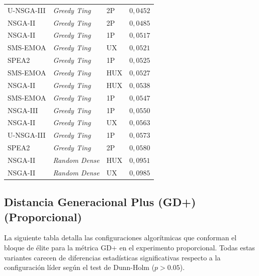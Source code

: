 \begin{longtable}{lllc}
U-NSGA-III & \textit{Greedy Ting} & 2P & $0{,}0452$ \\
NSGA-II & \textit{Greedy Ting} & 2P & $0{,}0485$ \\
NSGA-II & \textit{Greedy Ting} & 1P & $0{,}0517$ \\
SMS-EMOA & \textit{Greedy Ting} & UX & $0{,}0521$ \\
SPEA2 & \textit{Greedy Ting} & 1P & $0{,}0525$ \\
SMS-EMOA & \textit{Greedy Ting} & HUX & $0{,}0527$ \\
NSGA-II & \textit{Greedy Ting} & HUX & $0{,}0538$ \\
SMS-EMOA & \textit{Greedy Ting} & 1P & $0{,}0547$ \\
NSGA-III & \textit{Greedy Ting} & 1P & $0{,}0550$ \\
NSGA-II & \textit{Greedy Ting} & UX & $0{,}0563$ \\
U-NSGA-III & \textit{Greedy Ting} & 1P & $0{,}0573$ \\
SPEA2 & \textit{Greedy Ting} & 2P & $0{,}0580$ \\
NSGA-II & \textit{Random Dense} & HUX & $0{,}0951$ \\
NSGA-II & \textit{Random Dense} & UX & $0{,}0985$ \\
\end{longtable}

\subsection{Distancia Generacional Plus (GD+) (Proporcional)}\label{anexo:elite_gd_prop}

La siguiente tabla detalla las configuraciones algorítmicas que conforman el bloque de élite para la métrica GD+ en el experimento proporcional. Todas estas variantes carecen de diferencias estadísticas significativas respecto a la configuración líder según el test de Dunn-Holm ($p > 0.05$).

